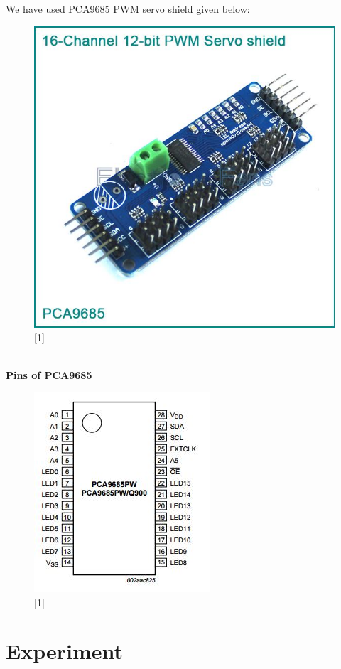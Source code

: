 \documentclass[11pt,a4paper]{article}
\begin{document}
	 We have used PCA9685 PWM servo shield given below:
	 \newline
	 \begin{figure}[h!]
	 	\includegraphics[scale=0.4]{pca9685.jpg}
	 	\centering
	 	\caption{[1]}
	 \end{figure}  \\
	 \newpage
	 \textbf{Pins of PCA9685 }
	 
	 \begin{figure}[h!]
	 	\includegraphics[scale=0.8]{pin_pca9685.jpg}
	 	\centering
	 	\caption{[1]}
	 \end{figure}
	\section{Experiment}
	
\end{document}

